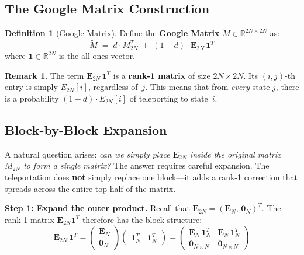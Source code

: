 \documentclass[11pt,a4paper]{article}
\theoremstyle{definition}
\newtheorem{definition}{Definition}
\newtheorem{remark}{Remark}
\begin{document}
\subsection{The Google Matrix Construction}

\begin{definition}[{Google Matrix}]
Define the \textbf{Google Matrix} $\widetilde{M} \in \mathbb{R}^{2N \times 2N}$ as:
\begin{equation}\label{eq:google}
\boxed{
\widetilde{M} \;=\; d \cdot M_{2N}^T
\;+\; (1-d) \cdot \bm{E}_{2N}\,\bm{1}^T
}
\end{equation}
where $\bm{1} \in \mathbb{R}^{2N}$ is the all-ones vector.
\end{definition}

\begin{remark}
The term $\bm{E}_{2N}\,\bm{1}^T$ is a \textbf{rank-1 matrix} of size
$2N \times 2N$.  Its $(i,j)$-th entry is simply $E_{2N}[i]$, regardless
of~$j$.  This means that from \emph{every} state $j$, there is a
probability $(1-d)\cdot E_{2N}[i]$ of teleporting to state~$i$.
\end{remark}

\subsection{Block-by-Block Expansion}

A natural question arises: \emph{can we simply place $\bm{E}_{2N}$ inside the
original matrix $M_{2N}$ to form a single matrix?}  The answer requires
careful expansion.  The teleportation does \textbf{not} simply replace one
block---it adds a rank-1 correction that spreads across the entire top half
of the matrix.

\medskip
\noindent\textbf{Step 1: Expand the outer product.}
Recall that $\bm{E}_{2N} = (\bm{E}_N,\, \bm{0}_N)^T$.  The rank-1 matrix
$\bm{E}_{2N}\bm{1}^T$ therefore has the block structure:
\begin{equation}\label{eq:outerblock}
\bm{E}_{2N}\,\bm{1}^T
= \begin{pmatrix} \bm{E}_N \\ \bm{0}_N \end{pmatrix}
  \begin{pmatrix} \bm{1}_N^T & \bm{1}_N^T \end{pmatrix}
= \begin{pmatrix}
    \bm{E}_N\,\bm{1}_N^T & \bm{E}_N\,\bm{1}_N^T \\[4pt]
    \bm{0}_{N\times N}    & \bm{0}_{N\times N}
  \end{pmatrix}
\end{equation}
\end{document}
